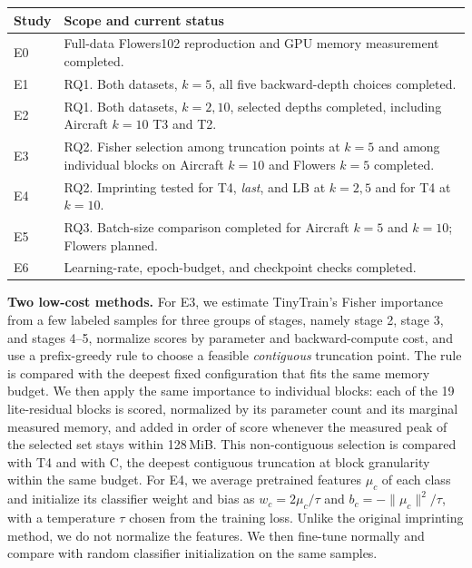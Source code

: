 \documentclass[sigconf,nonacm]{acmart}
\begin{document}
\begin{center}
  \footnotesize
  \renewcommand{\arraystretch}{1.15}
  \begin{tabularx}{\columnwidth}{@{}lX@{}}
    \toprule
    Study & Scope and current status \\
    \midrule
    E0 & Full-data Flowers102 reproduction and GPU memory measurement completed. \\
    E1 & RQ1. Both datasets, $k=5$, all five backward-depth choices completed. \\
    E2 & RQ1. Both datasets, $k=2,10$, selected depths completed, including Aircraft $k=10$ T3 and T2. \\
    E3 & RQ2. Fisher selection among truncation points at $k=5$ and among individual blocks on Aircraft $k=10$ and Flowers $k=5$ completed. \\
    E4 & RQ2. Imprinting tested for T4, \emph{last}, and LB at $k=2,5$ and for T4 at $k=10$. \\
    E5 & RQ3. Batch-size comparison completed for Aircraft $k=5$ and $k=10$; Flowers planned. \\
    E6 & Learning-rate, epoch-budget, and checkpoint checks completed. \\
    \bottomrule
  \end{tabularx}
\end{center}

\textbf{Two low-cost methods.} For E3, we estimate TinyTrain's Fisher importance \cite{kwon2024tinytrain} from a few labeled samples for three groups of stages, namely stage 2, stage 3, and stages 4--5, normalize scores by parameter and backward-compute cost, and use a prefix-greedy rule to choose a feasible \emph{contiguous} truncation point. The rule is compared with the deepest fixed configuration that fits the same memory budget. We then apply the same importance to individual blocks: each of the 19 lite-residual blocks is scored, normalized by its parameter count and its marginal measured memory, and added in order of score whenever the measured peak of the selected set stays within 128\,MiB. This non-contiguous selection is compared with T4 and with C, the deepest contiguous truncation at block granularity within the same budget. For E4, we average pretrained features $\mu_c$ of each class and initialize its classifier weight and bias as $w_c=2\mu_c/\tau$ and $b_c=-\lVert\mu_c\rVert^2/\tau$, with a temperature $\tau$ chosen from the training loss. Unlike the original imprinting method, we do not normalize the features. We then fine-tune normally and compare with random classifier initialization on the same samples.
\end{document}
